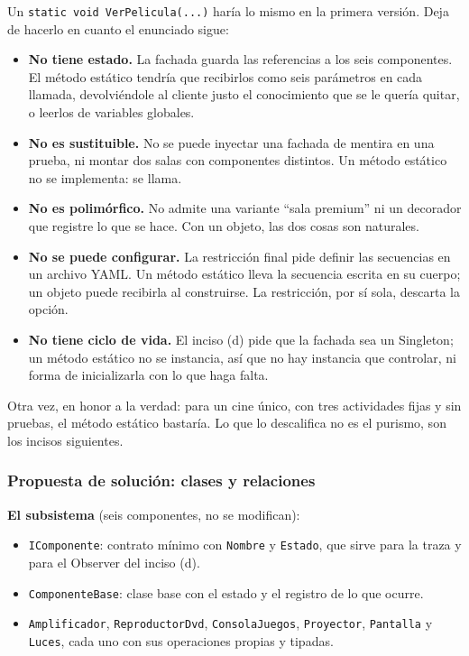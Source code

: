 Un \texttt{static void VerPelicula(...)} haría lo mismo en la primera versión. Deja de hacerlo
en cuanto el enunciado sigue:

\begin{itemize}[leftmargin=1.2cm]
    \item \textbf{No tiene estado.} La fachada guarda las referencias a los seis
          componentes. El método estático tendría que recibirlos como seis parámetros en
          cada llamada, devolviéndole al cliente justo el conocimiento que se le quería
          quitar, o leerlos de variables globales.
    \item \textbf{No es sustituible.} No se puede inyectar una fachada de mentira en una
          prueba, ni montar dos salas con componentes distintos. Un método estático no se
          implementa: se llama.
    \item \textbf{No es polimórfico.} No admite una variante ``sala premium'' ni un
          decorador que registre lo que se hace. Con un objeto, las dos cosas son naturales.
    \item \textbf{No se puede configurar.} La restricción final pide definir las secuencias
          en un archivo YAML. Un método estático lleva la secuencia escrita en su cuerpo;
          un objeto puede recibirla al construirse. La restricción, por sí sola, descarta la
          opción.
    \item \textbf{No tiene ciclo de vida.} El inciso (d) pide que la fachada sea un
          Singleton; un método estático no se instancia, así que no hay instancia que
          controlar, ni forma de inicializarla con lo que haga falta.
\end{itemize}

Otra vez, en honor a la verdad: para un cine único, con tres actividades fijas y sin pruebas,
el método estático bastaría. Lo que lo descalifica no es el purismo, son los incisos
siguientes.

\subsubsection*{Propuesta de solución: clases y relaciones}

\textbf{El subsistema} (seis componentes, no se modifican):

\begin{itemize}[leftmargin=1.2cm]
    \item \texttt{IComponente}: contrato mínimo con \texttt{Nombre} y \texttt{Estado}, que
          sirve para la traza y para el Observer del inciso (d).
    \item \texttt{ComponenteBase}: clase base con el estado y el registro de lo que ocurre.
    \item \texttt{Amplificador}, \texttt{ReproductorDvd}, \texttt{ConsolaJuegos},
          \texttt{Proyector}, \texttt{Pantalla} y \texttt{Luces}, cada uno con sus
          operaciones propias y tipadas.
\end{itemize}

